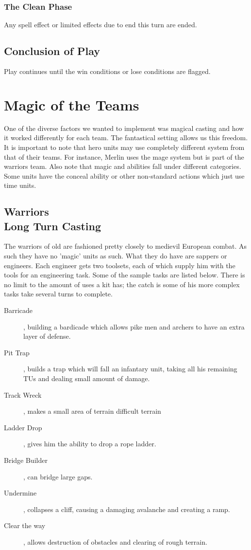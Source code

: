 \documentclass[a4paper,twocolumn]{article}
\begin{document}
\subsubsection{The Clean Phase}
Any spell effect or limited effects due to end this turn are ended.

\subsection{Conclusion of Play}
Play continues until the win conditions or lose conditions are flagged.


\newpage \section{Magic of the Teams}

One of the diverse factors we wanted to implement was magical casting and how it worked differently for each team. The fantastical setting allows us this freedom. It is important to note that hero units may use completely different system from that of their teams. For instance, Merlin uses the mage system but is part of the warriors team. Also note that magic and abilities fall under different categories. Some units have the conceal ability or other non-standard actions which just use time units.

\subsection{Warriors \\ Long Turn Casting}

The warriors of old are fashioned pretty closely to medievil European combat. As such they have no 'magic' units as such. What they do have are sappers or engineers. Each engineer gets two toolsets, each of which supply him with the tools for an engineering task. Some of the sample tasks are listed below. There is no limit to the amount of uses a kit has; the catch is some of his more complex tasks take several turns to complete.

\begin{description}
\item[Barricade], building a bardicade which allows pike men and archers to have an extra layer of defense.
\item[Pit Trap], builds a trap which will fall an infantary unit, taking all his remaining TUs and dealing small amount of damage.
\item[Track Wreck], makes a small area of terrain difficult terrain
\item[Ladder Drop], gives him the ability to drop a rope ladder.
\item[Bridge Builder], can bridge large gaps.
\item[Undermine], collapses a cliff, causing a damaging avalanche and creating a ramp.
\item[Clear the way], allows destruction of obstacles and clearing of rough terrain.
\end{description}
\end{document}
